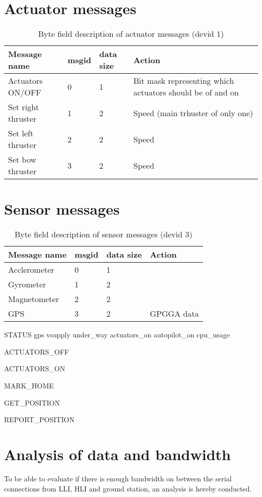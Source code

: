 
\section{Actuator messages}
\begin{table}[h]
	\centering
	\begin{tabular}{llll}
		\toprule
		\textbf{Message name}  & \textbf{msgid} & \textbf{data size} & \textbf{Action}\\
		\midrule
		Actuators ON/OFF & 0 & 1 & Bit mask representing which actuators should be of and on\\
		Set right thruster & 1 & 2 & Speed (main trhuster of only one) \\
		Set left thruster & 2 & 2 & Speed \\
		Set bow thruster & 3 & 2 & Speed \\
		\bottomrule
	\end{tabular}
	\caption{Byte field description of actuator messages (devid 1)}
	\label{tab:ack}
\end{table}

\section{Sensor messages}
\begin{table}[h]
	\centering
	\begin{tabular}{llll}
		\toprule
		\textbf{Message name}  & \textbf{msgid} & \textbf{data size} & \textbf{Action}\\
		\midrule
		Acclerometer & 0 & 1 & \\
		Gyrometer & 1 & 2 & \\
		Magnetometer & 2 & 2 &  \\
		GPS & 3 & 2 & GPGGA data \\
		\bottomrule
	\end{tabular}
	\caption{Byte field description of sensor messages (devid 3)}
	\label{tab:ack}
\end{table}




STATUS
gps
vsupply
under\_way
actuators\_on
autopilot\_on
cpu\_usage

ACTUATORS\_OFF

ACTUATORS\_ON

MARK\_HOME

GET\_POSITION

REPORT\_POSITION


\section{Analysis of data and bandwidth}
\label{sec:lli-bandwith}
To be able to evaluate if there is enough bandwidth on between the serial connections from LLI, HLI and ground station, an analysis is hereby conducted.

